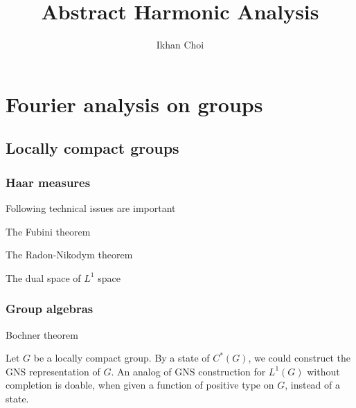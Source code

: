\documentclass{../../large}
\begin{document}
\title{Abstract Harmonic Analysis}
\author{Ikhan Choi}
\maketitle
\tableofcontents



\part{Fourier analysis on groups}

\chapter{Locally compact groups}
\section{Haar measures}

\begin{prb}
Following technical issues are important
\begin{parts}
\item The Fubini theorem
\item The Radon-Nikodym theorem
\item The dual space of $L^1$ space
\end{parts}
\end{prb}

\begin{prb}
\end{prb}




\section{Group algebras}
\begin{prb}
\end{prb}
\begin{prb}[Convolution]
\end{prb}
\begin{prb}
Bochner theorem
\end{prb}
\begin{prb}
\end{prb}
\begin{prb}
Let $G$ be a locally compact group.
By a state of $C^*(G)$, we could construct the GNS representation of $G$.
An analog of GNS construction for $L^1(G)$ without completion is doable, when given a function of positive type on $G$, instead of a state.
\end{prb}
\end{document}
